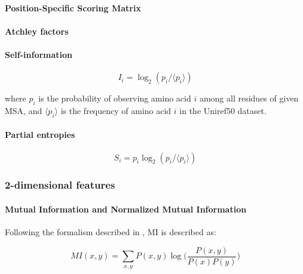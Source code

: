         \paragraph{Position-Specific Scoring Matrix}

        \paragraph{Atchley factors}


        \paragraph{Self-information}

            \cite{Michel383133}

            \begin{equation}
                I_i = \log_2 (p_i / \langle p_i \rangle)
            \end{equation}

            where $p_i$ is the probability of observing amino acid $i$ among all residues
            of given MSA, and $\langle p_i \rangle$ is the frequency of amino acid $i$
            in the Uniref50 dataset.

        \paragraph{Partial entropies}

            \cite{Michel383133}

            \begin{equation}
                S_i = p_i \log_2 (p_i / \langle p_i \rangle)
            \end{equation}

    \subsubsection{2-dimensional features}

        \paragraph{Mutual Information and Normalized Mutual Information}

            Following the formalism described in \cite{Michel383133}, MI is described as:

            \begin{equation}
                MI(x, y) = \sum\limits_{x, y} P(x, y) \log \Big( \frac{P(x, y)}{P(x) P(y)} \Big)
            \end{equation}

